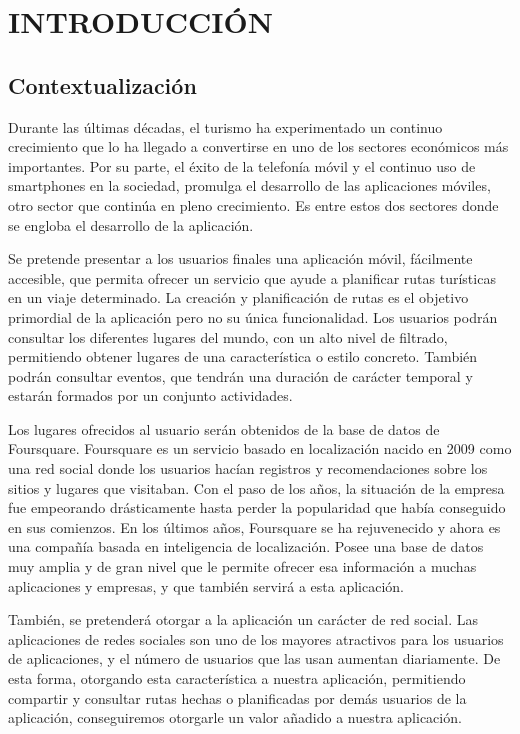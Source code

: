 \setcounter{page}{1}
\chapter[Introducción]{
  \label{chp:introduccion}
  INTRODUCCIÓN
}
\thispagestyle{numberingStyle}
\pagestyle{numberingStyle}


\section{Contextualización}
Durante las últimas décadas, el turismo ha experimentado un continuo crecimiento que lo ha llegado a convertirse en uno de los sectores económicos más importantes. Por su parte, el éxito de la telefonía móvil y el continuo uso de smartphones en la sociedad, promulga el desarrollo de las aplicaciones móviles, otro sector que continúa en pleno crecimiento. Es entre estos dos sectores donde se engloba el desarrollo de la aplicación.

Se pretende presentar a los usuarios finales una aplicación móvil, fácilmente accesible, que permita ofrecer un servicio que ayude a planificar rutas turísticas en un viaje determinado. La creación y planificación de rutas es el objetivo primordial de la aplicación pero no su única funcionalidad. Los usuarios podrán consultar los diferentes lugares del mundo, con un alto nivel de filtrado, permitiendo obtener lugares de una característica o estilo concreto. También podrán consultar eventos, que tendrán una duración de carácter temporal y estarán formados por un conjunto actividades.

Los lugares ofrecidos al usuario serán obtenidos de la base de datos de Foursquare. Foursquare es un servicio basado en localización nacido en 2009 como una red social donde los usuarios hacían registros y recomendaciones sobre los sitios y lugares que visitaban. Con el paso de los años, la situación de la empresa fue empeorando drásticamente hasta perder la popularidad que había conseguido en sus comienzos. En los últimos años, Foursquare se ha rejuvenecido y ahora es una compañía basada en inteligencia de localización. Posee una base de datos muy amplia y de gran nivel que le permite ofrecer esa información a muchas aplicaciones y empresas, y que también servirá a esta aplicación.

También, se pretenderá otorgar a la aplicación un carácter de red social. Las aplicaciones de redes sociales son uno de los mayores atractivos para los usuarios de aplicaciones, y el número de usuarios que las usan aumentan diariamente. De esta forma, otorgando esta característica a nuestra aplicación, permitiendo compartir y consultar rutas hechas o planificadas por demás usuarios de la aplicación, conseguiremos otorgarle un valor añadido a nuestra aplicación.


